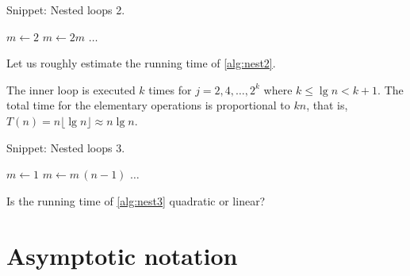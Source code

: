 
\begin{algorithm}[H]
  \caption{Snippet: Nested loops 2.}
  \label{alg:nest2}
\begin{algorithmic}[0]
\State $m \leftarrow 2$
		\State $m \leftarrow 2m$
			\State $\ldots$ 
		\EndFor
	\EndIf 
\EndFor
\end{algorithmic}
\end{algorithm}

\begin{Boxample}[1] \label{exm:nest2}
Let us roughly estimate the running time of \cref{alg:nest2}.

The inner loop is executed $k$ times for $j = 2, 4, \ldots, 2^{k}$
where $k \leq \lg n < k + 1$. The total time for the elementary operations is 
proportional to $kn$, that is, $T(n) =  n  \lfloor \lg n \rfloor \approx n \lg n$.
\end{Boxample}


\begin{algorithm}[H]
  \caption{Snippet: Nested loops 3.}
  \label{alg:nest3}
\begin{algorithmic}[0]
\State $m \leftarrow 1$
		\State $m \leftarrow m \,(n - 1)$
			\State $\ldots$ 
		\EndFor
	\EndIf
\EndFor 
\end{algorithmic}
\end{algorithm}

\begin{Boxample}[6] \label{exm:nest1}
Is the running time of \cref{alg:nest3} quadratic or linear?
\end{Boxample}



\chapter{Asymptotic notation} %

